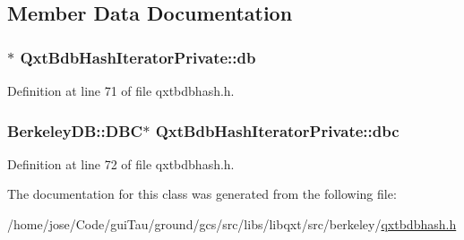 \subsection{Member Data Documentation}
\hypertarget{class_qxt_bdb_hash_iterator_private_a9e8dd75f01c318bb00a64f935f3c3317}{
\subsubsection[{db}]{$\ast$ Qxt\-Bdb\-Hash\-Iterator\-Private\-::db}}\label{class_qxt_bdb_hash_iterator_private_a9e8dd75f01c318bb00a64f935f3c3317}


Definition at line 71 of file qxtbdbhash.\-h.

\hypertarget{class_qxt_bdb_hash_iterator_private_aa253a0fe03733df052da0903458ed5f8}{
\subsubsection[{dbc}]{\setlength{\rightskip}{0pt plus 5cm}Berkeley\-D\-B\-::\-D\-B\-C$\ast$ Qxt\-Bdb\-Hash\-Iterator\-Private\-::dbc}}\label{class_qxt_bdb_hash_iterator_private_aa253a0fe03733df052da0903458ed5f8}


Definition at line 72 of file qxtbdbhash.\-h.



The documentation for this class was generated from the following file\-:\begin{DoxyCompactItemize}
\item 
/home/jose/\-Code/gui\-Tau/ground/gcs/src/libs/libqxt/src/berkeley/\hyperlink{qxtbdbhash_8h}{qxtbdbhash.\-h}\end{DoxyCompactItemize}
